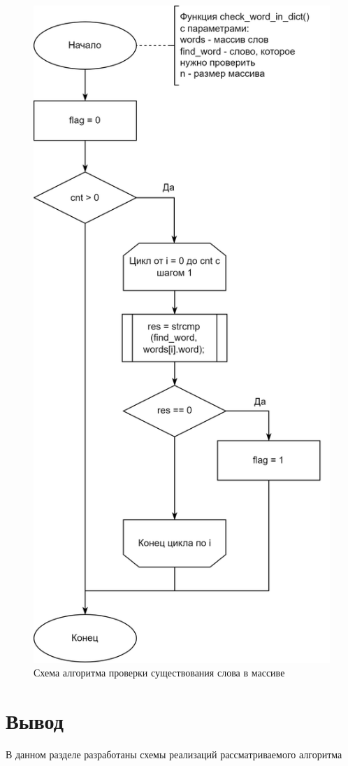 \begin{figure}[h]
	\centering
	\includegraphics[height=0.7\textheight]{img/check_word.png}
	\caption{Схема алгоритма проверки существования слова в массиве}
	\label{fig:check}
\end{figure}

\section*{Вывод}

В данном разделе разработаны схемы реализаций рассматриваемого алгоритма